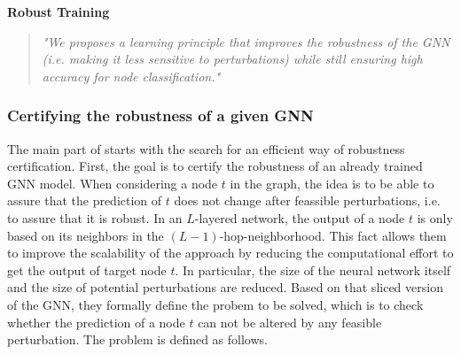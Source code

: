 \documentclass[a4paper,preprint]{sig-alternate}
\begin{document}
\textbf{Robust Training}
\begin{quote}
    \emph{"We proposes a learning principle that improves the robustness of the GNN (i.e. making it less sensitive to perturbations) 
    while still ensuring high accuracy for node classification."} \cite{Zuegner_2019}
\end{quote}

\vfill
\pagebreak

\subsubsection{Certifying the robustness of a given GNN}
\label{subsec:robustness_certification}

The main part of \cite{Zuegner_2019} starts with the search for an efficient way of robustness certification.
First, the goal is to certify the robustness of an already trained GNN model. When considering a node $t$ in the graph, the idea is to be 
able to assure that the prediction of $t$ does not change after feassible perturbations, i.e. to assure that it is robust.
In an $L$-layered network, the output of a node $t$ is only based on its neighbors in the $(L-1)$-hop-neighborhood. \cite{Zuegner_2019}
This fact allows them to improve the scalability of the approach by reducing the computational effort to get the output
of target node $t$. In particular, the size of the neural network itself and the size of potential perturbations are reduced.
Based on that sliced version of the GNN, they formally define the probem to be solved, which is to check whether the prediction 
of a node $t$ can not be altered by any feasible perturbation. The problem is defined as follows.\newline
\end{document}
